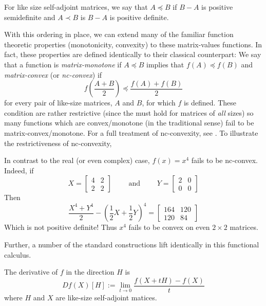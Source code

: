 \begin{definition}
\label{def:LoewnerOrder}
  For like size self-adjoint matrices, we say that \(A \preceq B\) if \(B - A \)
  is positive semidefinite and \(A \prec B\) is \(B-A\) is positive definite.
\end{definition}

With this ordering in place, we can extend many of the familiar function
theoretic properties (monotonicity, convexity) to these matrix-values functions.
In fact, these properties are defined identically to their classical counterpart:
We say that a function is \emph{matrix-monotone} if \(A \preceq B\) implies that
\(f(A) \preceq f(B)\) and \emph{matrix-convex} (or \emph{nc-convex}) if
\[
  f \left( \frac{A+B}{2} \right) \preceq \frac{f(A)+f(B)}{2}
\]
for every pair of like-size matrices, \(A\) and \(B\), for which \(f\) is defined. These condition
are rather restrictive (since the must hold for matrices of \emph{all} sizes) so
many functions which are convex/monotone (in the traditional sense) fail to be
matrix-convex/monotone. For a full treatment of nc-convexity, see
\cite{heltonFree2013}. To illustrate the restrictiveness of nc-convexity,
\begin{example}%
\label{ex:helton1}
  In contrast to the real (or even complex) case, \(f(x)=x^4\) fails to be nc-convex.
  Indeed, if
  \[
    X = \begin{bmatrix} 4 &2\\2&2 \end{bmatrix}  \qquad \text{ and } \qquad Y =\begin{bmatrix} 2&0\\0&0 \end{bmatrix}
  \]
  Then
  \[
    \frac{X^4+Y^4}{2} - \left( \frac{1}{2}X +\frac{1}{2}Y \right) ^4
    = \begin{bmatrix} 164 &120\\120&84 \end{bmatrix}
  \]
  Which is not positive definite! Thus \(x^4\) fails to be convex on even
  \(2\times 2\) matrices.
\end{example}

Further, a number of the standard constructions lift identically in this
functional calculus.
\begin{definition}
  \label{def:DirDeriv}
  The derivative of \(f\) in the direction \(H\) is
  \[
    Df(X)[H] := \lim_{t \to 0} \frac{f(X+tH) - f(X)}{t}
  \]
  where \(H\) and \(X\) are like-size self-adjoint matices.
\end{definition}

